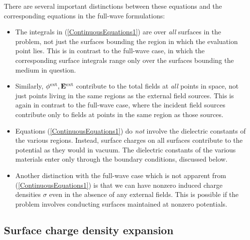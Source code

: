 \documentclass[letterpaper]{article}
\begin{document}
There are several important distinctions between these 
equations and the corresponding equations in the full-wave
formulations: 
\begin{itemize}
 \item
 The integrals in (\ref{ContinuousEquations1}) are over 
 \textit{all} surfaces in the problem, not just the surfaces 
 bounding the region in which the evaluation point lies. 
 This is in contrast to the full-wave case, in which the 
 corresponding surface integrals range only over the surfaces 
 bounding the medium in question.
 \item
 Similarly, $\phi^{\hbox{\scriptsize{ext}}}, \mathbf{E}^{\hbox{\scriptsize{ext}}}$ contribute 
 to the total fields at \textit{all} points in space, not 
 just points living in the same regions as the external 
 field sources. This is again in contrast to the full-wave 
 case, where the incident field sources contribute only
 to fields at points in the same region as those sources.
 \item
 Equations (\ref{ContinuousEquations1}) do \textit{not}
 involve the dielectric constants of the various regions.
 Instead, surface charges on all surfaces contribute to 
 the potential as they would in vacuum. The dielectric 
 constants of the various materials enter only through
 the boundary conditions, discussed below.
 \item
 Another distinction with the full-wave case which is not 
 apparent from (\ref{ContinuousEquations1}) is that we can 
 have nonzero induced charge densities $\sigma$ even in 
 the absence of any external fields. This is possible
 if the problem involves conducting surfaces maintained
 at nonzero potentials.
\end{itemize}

\subsection*{Surface charge density expansion}
\end{document}
